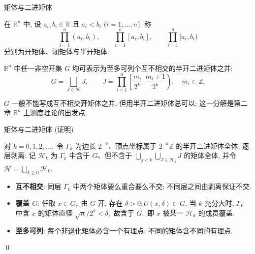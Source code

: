 
\begin{frame}{矩体与二进矩体}

\begin{Def}[矩体]
在 $\mathbb{R}^n$ 中, 设 $a_i, b_i \in \mathbb{R}$ 且 $a_i < b_i$ ($i = 1, \ldots, n$). 称
\[
\prod_{i=1}^n (a_i, b_i), \qquad \prod_{i=1}^n [a_i, b_i], \qquad \prod_{i=1}^n [a_i, b_i)
\]
分别为\alert{开矩体、闭矩体与半开矩体}.
\end{Def}

\pause

\begin{thm}[构成区间定理的推广]
$\mathbb{R}^n$ 中任一非空开集 $G$ 均可表示为\alert{至多可列个互不相交的半开二进矩体}之并:
\[
G = \bigsqcup_{J \in \mathcal{H}} J, \qquad J = \prod_{i=1}^n \left[ \frac{m_i}{2^k}, \frac{m_i + 1}{2^k} \right), \quad m_i \in \mathbb{Z}.
\]
\end{thm}

\begin{remark}
$G$ 一般不能写成互不相交\textbf{开}矩体之并, 但用半开二进矩体总可以; 这一分解是第二章 $\mathbb{R}^n$ 上测度理论的出发点.
\end{remark}

\end{frame}


\begin{frame}{矩体与二进矩体 (证明)}

\startproof[bg=yellow, fg=red]
对 $k = 0, 1, 2, \ldots,$ 令 $\Gamma_k$ 为边长 $2^{-k}$、顶点坐标属于 $2^{-k} \mathbb{Z}$ 的半开二进矩体全体. 逐层\alert{剥离}: 记 $\mathcal{H}_k$ 为 $\Gamma_k$ 中含于 $G$、但不含于 $\bigcup_{j<k} \bigcup_{J \in \mathcal{H}_j} J$ 的矩体全体, 并令 $\mathcal{H} = \bigcup_{k \geqslant 0} \mathcal{H}_k.$
\pause
\begin{itemize}
\item \textbf{互不相交}: 同层 $\Gamma_k$ 中两个矩体要么重合要么不交; 不同层之间由剥离保证不交.
\item \textbf{覆盖 $G$}: 任取 $x \in G,$ 由 $G$ 开, 存在 $\delta > 0: U(x, \delta) \subset G.$ 当 $k$ 充分大时, $\Gamma_k$ 中含 $x$ 的矩体直径 $\sqrt{n}/2^k < \delta,$ 故含于 $G,$ 即 $x$ 被某一 $\mathcal{H}_k$ 的成员覆盖.
\item \textbf{至多可列}: 每个非退化矩体必含一个有理点, 不同的矩体含不同的有理点.
\end{itemize}
\qed

\end{frame}

